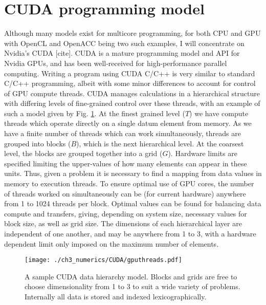 \section{CUDA programming model}
Although many models exist for multicore programming, for both CPU and GPU with OpenCL and OpenACC being two such examples, I will concentrate on Nvidia's CUDA [cite]. CUDA is a mature programming model and API for Nvidia GPUs, and has been well-received for high-performance parallel computing. Writing a program using CUDA C/C++ is very similar to standard C/C++ programming, albeit with some minor differences to account for control of GPU compute threads. CUDA manages calculations in a hierarchical structure with differing levels of fine-grained control over these threads, with an example of such a model given by Fig. \ref{fig:gpu_threads}. At the finest grained level ($T$) we have compute threads which operate directly on a single datum element from memory. As we have a finite number of threads which can work simultaneously, threads are grouped into blocks ($B$), which is the next hierarchical level. At the coarsest level, the blocks are grouped together into a grid ($G$). Hardware limits are specified limiting the upper-values of how many elements can appear in these units. Thus, given a problem it is necessary to find a mapping from data values in memory to execution threads. To ensure optimal use of GPU cores, the number of threads worked on simultaneously can be (for current hardware) anywhere from 1 to 1024 threads per block. Optimal values can be found for balancing data compute and transfers, giving, depending on system size, necessary values for block size, as well as grid size. The dimensions of each hierarchical layer are independent of one another, and may be anywhere from 1 to 3, with a hardware dependent limit only imposed on the maximum number of elements.

\begin{figure}[tb]
    \centering
    \texttt{[image: ./ch3\_numerics/CUDA/gputhreads.pdf]}
    \caption{A sample CUDA data hierarchy model. Blocks and grids are free to choose dimensionality from 1 to 3 to suit a wide variety of problems. Internally all data is stored and indexed lexicographically.}
    \label{fig:gpu_threads}
\end{figure}


